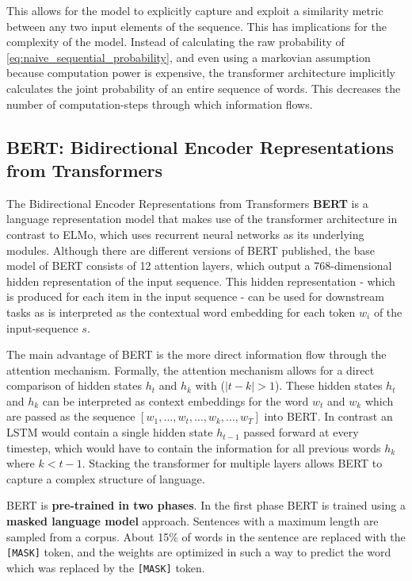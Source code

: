 \documentclass[a4paper,12pt,oneside,openright]{report}
\begin{document}
This allows for the model to explicitly capture and exploit a similarity metric between any two input elements of the sequence.
This has implications for the complexity of the model.
Instead of calculating the raw probability of \eqref{eq:naive_sequential_probability}, and even using a markovian assumption because computation power is expensive, the transformer architecture implicitly calculates the joint probability of an entire sequence of words.
This decreases the number of computation-steps through which information flows. \\

\subsection{BERT: Bidirectional Encoder Representations from Transformers}\label{section:BERT}
 
The Bidirectional Encoder Representations from Transformers \textbf{BERT} \cite{devlin18} is a language representation model that makes use of the transformer architecture in contrast to ELMo, which uses recurrent neural networks as its underlying modules.
Although there are different versions of BERT published, the base model of BERT consists of 12 attention layers, which output a 768-dimensional hidden representation of the input sequence.
This hidden representation - which is produced for each item in the input sequence - can be used for downstream tasks as is interpreted as the contextual word embedding for each token $w_i$ of the input-sequence $s$.

The main advantage of BERT is the more direct information flow through the attention mechanism. 
Formally, the attention mechanism allows for a direct comparison of hidden states $h_t$ and $h_k$ with ($|t - k| > 1$).
These hidden states $h_t$ and $h_k$ can be interpreted as context  embeddings for the word $w_t$ and $w_k$ which are passed as the sequence $[w_1, \ldots, w_t, \ldots, w_k, \ldots, w_T]$ into BERT.
In contrast  an LSTM would contain a single hidden state $h_{t-1}$ passed forward at every timestep, which would have to contain the information for all previous words $h_k$ where $k < t - 1$.
Stacking the transformer for multiple layers allows BERT to capture a complex structure of language.

BERT is \textbf{pre-trained in two phases}. 
In the first phase BERT is trained using a \textbf{masked language model} approach. 
Sentences with a maximum length are sampled from a corpus.
About 15\% of words in the sentence are replaced with the \texttt{[MASK]} token, and the weights are optimized in such a way to predict the word which was replaced by the \Verb#[MASK]# token.
\end{document}
